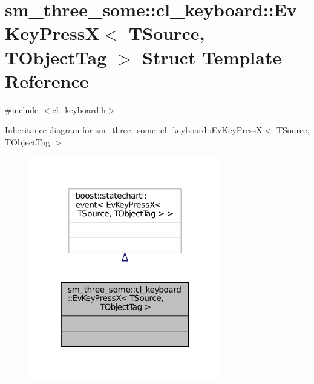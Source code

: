 \hypertarget{structsm__three__some_1_1cl__keyboard_1_1EvKeyPressX}{}\section{sm\+\_\+three\+\_\+some\+:\+:cl\+\_\+keyboard\+:\+:Ev\+Key\+PressX$<$ T\+Source, T\+Object\+Tag $>$ Struct Template Reference}
\label{structsm__three__some_1_1cl__keyboard_1_1EvKeyPressX}


{\ttfamily \#include $<$cl\+\_\+keyboard.\+h$>$}



Inheritance diagram for sm\+\_\+three\+\_\+some\+:\+:cl\+\_\+keyboard\+:\+:Ev\+Key\+PressX$<$ T\+Source, T\+Object\+Tag $>$\+:
\nopagebreak
\begin{figure}[H]
\begin{center}
\leavevmode
\includegraphics[width=238pt]{structsm__three__some_1_1cl__keyboard_1_1EvKeyPressX__inherit__graph}
\end{center}
\end{figure}


